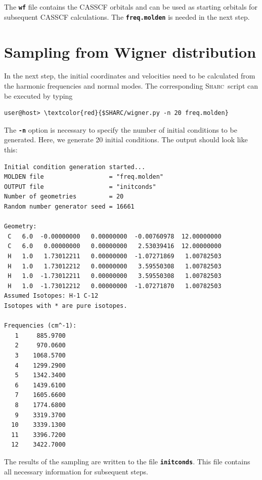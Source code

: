 \documentclass[a4paper,11pt,DIV=15,openany]{scrbook}
\newcommand{\sharc}{\textsc{Sharc}}
\newcommand{\ttt}[1]{\textbf{\texttt{#1}}}
\begin{document}
\normalsize
The \ttt{wf} file contains the CASSCF orbitals and can be used as starting orbitals for subsequent CASSCF calculations. The \ttt{freq.molden} is needed in the next step.

\clearpage
\section{Sampling from Wigner distribution}

In the next step, the initial coordinates and velocities need to be calculated from the harmonic frequencies and normal modes. The corresponding \sharc\ script can be executed by typing
\begin{Verbatim}[commandchars=\\\{\}]
user@host> \textcolor{red}{$SHARC/wigner.py -n 20 freq.molden}
\end{Verbatim}
The \ttt{-n} option is necessary to specify the number of initial conditions to be generated. Here, we generate 20 initial conditions. The output should look like this:
\begin{oframed}
\footnotesize\begin{Verbatim}[commandchars=\\\{\}]
Initial condition generation started...
MOLDEN file                  = "freq.molden"
OUTPUT file                  = "initconds"
Number of geometries         = 20
Random number generator seed = 16661

Geometry:
 C   6.0  -0.00000000   0.00000000  -0.00760978  12.00000000
 C   6.0   0.00000000   0.00000000   2.53039416  12.00000000
 H   1.0   1.73012211   0.00000000  -1.07271869   1.00782503
 H   1.0   1.73012212   0.00000000   3.59550308   1.00782503
 H   1.0  -1.73012211   0.00000000   3.59550308   1.00782503
 H   1.0  -1.73012212   0.00000000  -1.07271870   1.00782503
Assumed Isotopes: H-1 C-12 
Isotopes with * are pure isotopes.

Frequencies (cm^-1):
   1     885.9700
   2     970.0600
   3    1068.5700
   4    1299.2900
   5    1342.3400
   6    1439.6100
   7    1605.6600
   8    1774.6800
   9    3319.3700
  10    3339.1300
  11    3396.7200
  12    3422.7000
\end{Verbatim}
\end{oframed}

The results of the sampling are written to the file \ttt{initconds}. This file contains all necessary information for subsequent steps.

\normalsize
\end{document}
